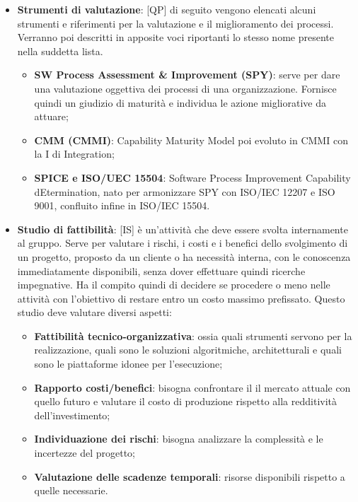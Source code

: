\begin{itemize}
	\item \textbf{Strumenti di valutazione}: [QP] di seguito vengono elencati alcuni strumenti e riferimenti per la valutazione e il miglioramento dei processi. Verranno poi descritti in apposite voci riportanti lo stesso nome presente nella suddetta lista.
		\begin{itemize}
			\item \textbf{SW Process Assessment \& Improvement (SPY)}: serve per dare una valutazione oggettiva dei processi di una organizzazione. Fornisce quindi un giudizio di maturità e individua le azione migliorative da attuare;
			\item \textbf{CMM (CMMI)}: Capability Maturity Model poi evoluto in CMMI con la I di Integration;
			\item \textbf{SPICE e ISO/UEC 15504}: Software Process Improvement Capability dEtermination, nato per armonizzare SPY con ISO/IEC 12207 e ISO 9001, confluito infine in ISO/IEC 15504.
		\end{itemize}
	\item \textbf{Studio di fattibilità}: [IS] è un'attività che deve essere svolta internamente al gruppo. Serve per valutare i rischi, i costi e i benefici dello svolgimento di un progetto, proposto da un cliente o ha necessità interna, con le conoscenza immediatamente disponibili, senza dover effettuare quindi ricerche impegnative. Ha il compito quindi di decidere se procedere o meno nelle attività con l'obiettivo di restare entro un costo massimo prefissato. \newline
	Questo studio deve valutare diversi aspetti:
		\begin{itemize}
			\item \textbf{Fattibilità tecnico-organizzativa}: ossia quali strumenti servono per la realizzazione, quali sono le soluzioni algoritmiche, architetturali e quali sono le piattaforme idonee per l'esecuzione;
			\item \textbf{Rapporto costi/benefici}: bisogna confrontare il il mercato attuale con quello futuro e valutare il costo di produzione rispetto alla redditività dell'investimento;
			\item \textbf{Individuazione dei rischi}: bisogna analizzare la complessità e le incertezze del progetto;
			\item \textbf{Valutazione delle scadenze temporali}: risorse disponibili rispetto a quelle necessarie.
		\end{itemize}
\end{itemize}